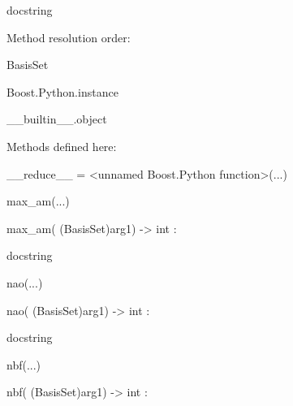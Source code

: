 \documentclass[letterpaper,10pt,english]{sphinxmanual}
\begin{document}
\begin{description}
\begin{description}
\item[{class BasisSet(Boost.Python.instance)}] \leavevmode
\begin{DUlineblock}{0em}
\item[] docstring
\item[] 
\item[] Method resolution order:
\item[]
\begin{DUlineblock}{\DUlineblockindent}
\item[] BasisSet
\item[] Boost.Python.instance
\item[] \_\_builtin\_\_.object
\item[] 
\end{DUlineblock}
\item[] Methods defined here:
\item[] 
\item[] \_\_reduce\_\_ = \textless{}unnamed Boost.Python function\textgreater{}(...)
\item[] 
\item[] max\_am(...)
\item[]
\begin{DUlineblock}{\DUlineblockindent}
\item[] max\_am( (BasisSet)arg1) -\textgreater{} int :
\item[]
\begin{DUlineblock}{\DUlineblockindent}
\item[] docstring
\item[] 
\end{DUlineblock}
\end{DUlineblock}
\item[] nao(...)
\item[]
\begin{DUlineblock}{\DUlineblockindent}
\item[] nao( (BasisSet)arg1) -\textgreater{} int :
\item[]
\begin{DUlineblock}{\DUlineblockindent}
\item[] docstring
\item[] 
\end{DUlineblock}
\end{DUlineblock}
\item[] nbf(...)
\item[]
\begin{DUlineblock}{\DUlineblockindent}
\item[] nbf( (BasisSet)arg1) -\textgreater{} int :

\end{DUlineblock}
\end{DUlineblock}
\end{description}
\end{description}
\end{document}
